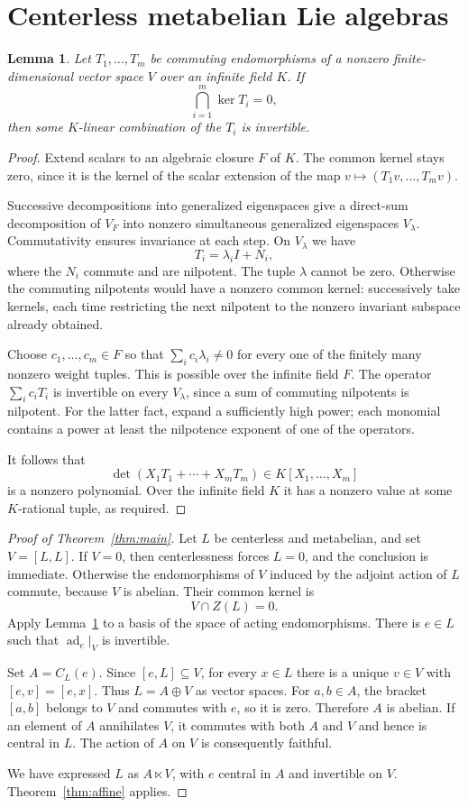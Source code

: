 \documentclass[11pt]{article}
\newtheorem{lemma}[theorem]{Lemma}
\theoremstyle{definition}
\DeclareMathOperator{\ad}{ad}
\begin{document}
\section{Centerless metabelian Lie algebras}
\begin{lemma}\label{lem:commuting}
Let $T_1,\ldots,T_m$ be commuting endomorphisms of a nonzero finite-dimensional vector space $V$ over an infinite field $K$. If
\[
 \bigcap_{i=1}^m\ker T_i=0,
\]
then some $K$-linear combination of the $T_i$ is invertible.
\end{lemma}
\begin{proof}
Extend scalars to an algebraic closure $F$ of $K$. The common kernel stays zero, since it is the kernel of the scalar extension of the map $v\mapsto(T_1v,\ldots,T_mv)$.

Successive decompositions into generalized eigenspaces give a direct-sum decomposition of $V_F$ into nonzero simultaneous generalized eigenspaces $V_\lambda$. Commutativity ensures invariance at each step. On $V_\lambda$ we have
\[
 T_i=\lambda_i I+N_i,
\]
where the $N_i$ commute and are nilpotent. The tuple $\lambda$ cannot be zero. Otherwise the commuting nilpotents would have a nonzero common kernel: successively take kernels, each time restricting the next nilpotent to the nonzero invariant subspace already obtained.

Choose $c_1,\ldots,c_m\in F$ so that $\sum_i c_i\lambda_i\ne0$ for every one of the finitely many nonzero weight tuples. This is possible over the infinite field $F$. The operator $\sum_i c_iT_i$ is invertible on every $V_\lambda$, since a sum of commuting nilpotents is nilpotent. For the latter fact, expand a sufficiently high power; each monomial contains a power at least the nilpotence exponent of one of the operators.

It follows that
\[
 \det(X_1T_1+\cdots+X_mT_m)\in K[X_1,\ldots,X_m]
\]
is a nonzero polynomial. Over the infinite field $K$ it has a nonzero value at some $K$-rational tuple, as required.
\end{proof}

\begin{proof}[Proof of Theorem~\ref{thm:main}]
Let $L$ be centerless and metabelian, and set $V=[L,L]$. If $V=0$, then centerlessness forces $L=0$, and the conclusion is immediate. Otherwise the endomorphisms of $V$ induced by the adjoint action of $L$ commute, because $V$ is abelian. Their common kernel is
\[
 V\cap Z(L)=0.
\]
Apply Lemma~\ref{lem:commuting} to a basis of the space of acting endomorphisms. There is $e\in L$ such that $\ad_e|_V$ is invertible.

Set $A=C_L(e)$. Since $[e,L]\subseteq V$, for every $x\in L$ there is a unique $v\in V$ with $[e,v]=[e,x]$. Thus $L=A\oplus V$ as vector spaces. For $a,b\in A$, the bracket $[a,b]$ belongs to $V$ and commutes with $e$, so it is zero. Therefore $A$ is abelian. If an element of $A$ annihilates $V$, it commutes with both $A$ and $V$ and hence is central in $L$. The action of $A$ on $V$ is consequently faithful.

We have expressed $L$ as $A\ltimes V$, with $e$ central in $A$ and invertible on $V$. Theorem~\ref{thm:affine} applies.
\end{proof}
\end{document}
